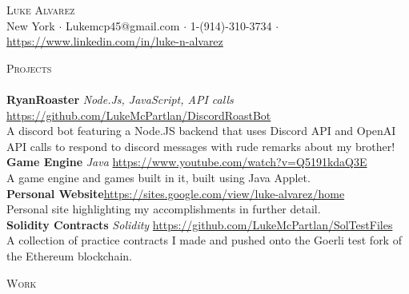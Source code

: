 \documentclass[a4paper]{article}
\newcommand{\lineunder} {
    \vspace*{-8pt} \\
    \hspace*{-18pt} \hrulefill \\
}
\newcommand{\header} [1] {
    {\hspace*{-18pt}\vspace*{6pt} \textsc{#1}}
    \vspace*{-6pt} \lineunder
}
\begin{document}
\vspace*{-40pt}

    

\vspace*{-10pt}
\begin{center}
	{\Huge \scshape {Luke Alvarez}}\\
	New York $\cdot$ Lukemcp45@gmail.com $\cdot$ 1-(914)-310-3734 $\cdot$ 
\href{https://www.linkedin.com/in/luke-n-alvarez}{https://www.linkedin.com/in/luke-n-alvarez} \\
\end{center}

\header{Projects}
{\textbf{RyanRoaster}} {\sl Node.Js, JavaScript, API calls} \hfill
\href{https://github.com/LukeMcPartlan/DiscordRoastBot}{https://github.com/LukeMcPartlan/DiscordRoastBot}\\
A discord bot featuring a Node.JS backend that uses Discord API and OpenAI API calls to respond to discord messages with rude remarks about my brother!\\
\vspace*{2mm}
{\textbf{Game Engine}} {\sl Java} \hfill \href{https://www.youtube.com/watch?v=Q5191kdaQ3E}{https://www.youtube.com/watch?v=Q5191kdaQ3E}\\
A game engine and games built in it, built using Java Applet.\\
\vspace*{2mm}
{\textbf{Personal Website}}\hfill \href{https://sites.google.com/view/luke-alvarez/home}{https://sites.google.com/view/luke-alvarez/home}\\
Personal site highlighting my accomplishments in further detail.\\
\vspace*{2mm}
{\textbf{Solidity Contracts}} {\sl Solidity} \hfill \href{https://github.com/LukeMcPartlan/SolTestFiles}{https://github.com/LukeMcPartlan/SolTestFiles}\\
A collection of practice contracts I made and pushed onto the Goerli test fork of the Ethereum blockchain.\\
\vspace*{2mm}



\header{Work}
\vspace{1mm}
\end{document}
